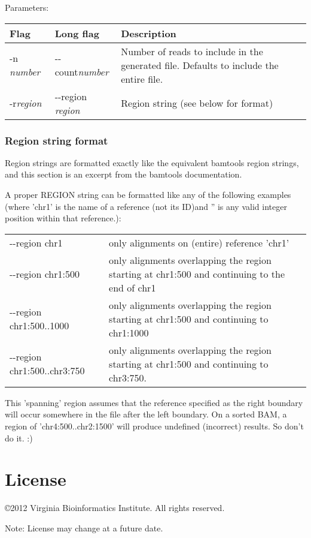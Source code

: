 \documentclass[11pt]{article}
\begin{document}
Parameters:
\begin{center}
\begin{tabular}{llp{3.5in}}
\hline
Flag&Long flag&Description\\ \hline
-n \textit{number}&{-}{-}count\textit{number}&Number of reads to include in the generated file. Defaults to include the entire file.\\
-r\textit{region}&{-}{-}region \textit{region}&Region string (see below for format)\\
\end{tabular}
\end{center}

\subsubsection{Region string format}
Region strings are formatted exactly like the equivalent bamtools region strings, and this section is an excerpt from the bamtools documentation.

A proper REGION string can be formatted like any of the following examples (where 'chr1' is the name of a reference (not its ID)and '' is any valid integer position within that reference.):

\begin{center}
\begin{tabular}{lp{3.5in}}
{-}{-}region chr1&only alignments on (entire) reference 'chr1'\\
{-}{-}region chr1:500&only alignments overlapping the region starting at chr1:500 and continuing to the end of chr1\\
{-}{-}region chr1:500..1000&only alignments overlapping the region starting at chr1:500 and continuing to chr1:1000\\
{-}{-}region chr1:500..chr3:750&only alignments overlapping the region starting at chr1:500 and continuing to chr3:750.\\
\end{tabular}
\end{center}

This 'spanning' region assumes that the reference specified as the right boundary will occur somewhere in the file after the left boundary. On a sorted BAM, a region of 'chr4:500..chr2:1500' will produce undefined (incorrect) results. So don't do it. :)

\section {License}
\copyright 2012 Virginia Bioinformatics Institute. All rights reserved.

Note: License may change at a future date.
\end{document}
